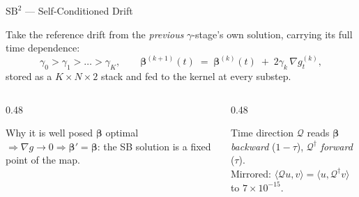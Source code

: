 \documentclass[aspectratio=169]{beamer}
\newcommand{\grad}{\nabla}
\newcommand{\Qcal}{\mathcal{Q}}
\begin{document}
\begin{frame}{$\mathrm{SB}^2$ — Self-Conditioned Drift}

Take the reference drift from the \emph{previous} $\gamma$-stage's own solution,
carrying its full time dependence:
\[
  \gamma_0>\gamma_1>\dots>\gamma_K,
  \qquad
  \boldsymbol{\beta}^{(k+1)}(t)\;=\;\boldsymbol{\beta}^{(k)}(t)\;+\;2\gamma_k\,\grad g^{(k)}_t ,
\]
stored as a $K\times N\times 2$ stack and fed to the kernel at every substep.

\vspace{0.4em}
\begin{columns}[T]
\begin{column}{0.48\textwidth}
\begin{block}{Why it is well posed}
$\boldsymbol{\beta}$ optimal $\Rightarrow\grad g\to0\Rightarrow
\boldsymbol{\beta}'=\boldsymbol{\beta}$: the SB solution is a fixed point of the map.
\end{block}
\end{column}
\begin{column}{0.48\textwidth}
\begin{alertblock}{Time direction}
$\Qcal$ reads $\boldsymbol{\beta}$ \emph{backward} ($1-\tau$),
$\Qcal^{\dagger}$ \emph{forward} ($\tau$).\\
Mirrored: $\langle\Qcal u,v\rangle=\langle u,\Qcal^{\dagger}v\rangle$ to
$7\times10^{-15}$.
\end{alertblock}
\end{column}
\end{columns}

\end{frame}
\end{document}
